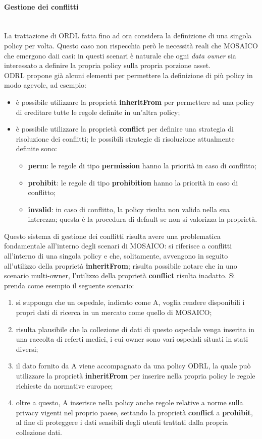 \documentclass[12pt,a4paper,twoside]{book}
\begin{document}
\paragraph{Gestione dei conflitti}\mbox{}\\
La trattazione di ORDL fatta fino ad ora considera la definizione di una singola policy per volta. Questo caso non rispecchia però le necessità reali che MOSAICO che emergono daii casi: in questi scenari è naturale che ogni \textit{data owner} sia interessato a definire la propria policy sulla propria porzione asset.\\
ODRL propone già alcuni elementi per permettere la definizione di più policy in modo agevole, ad esempio: 
\begin{itemize}
	\item è possibile utilizzare la proprietà \textbf{inheritFrom} per permettere ad una policy di ereditare tutte le regole definite in un'altra policy;
	\item è possibile utilizzare la proprietà \textbf{conflict} per definire una strategia di risoluzione dei conflitti; le possibili strategie di risoluzione attualmente definite sono:
	\begin{itemize}
		\item \textbf{perm}: le regole di tipo \textbf{permission} hanno la priorità in caso di conflitto;
		\item \textbf{prohibit}: le regole di tipo \textbf{prohibition} hanno la priorità in caso di conflitto;
		\item \textbf{invalid}: in caso di conflitto, la policy risulta non valida nella sua interezza; questa è la procedura di default se non si valorizza la proprietà.
	\end{itemize}
\end{itemize}
Questo sistema di gestione dei conflitti risulta avere una problematica fondamentale all'interno degli scenari di MOSAICO: si riferisce a conflitti all'interno di una singola policy e che, solitamente, avvengono in seguito all'utilizzo della proprietà \textbf{inheritFrom}; risulta possibile notare che in uno scenario multi-owner, l'utilizzo della proprietà \textbf{conflict} risulta inadatto. Si prenda come esempio il seguente scenario:
\begin{enumerate}
	\item si supponga che un ospedale, indicato come A, voglia rendere disponibili i propri dati di ricerca in un mercato come quello di MOSAICO;
	\item risulta plausibile che la collezione di dati di questo ospedale venga inserita in una raccolta di referti medici, i cui owner sono vari ospedali situati in stati diversi;
	\item il dato fornito da A viene accompagnato da una policy ODRL, la quale può utilizzare la proprietà \textbf{inheritFrom} per inserire nella propria policy le regole richieste da normative europee;
	\item oltre a questo, A inserisce nella policy anche regole relative a norme sulla privacy vigenti nel proprio paese, settando la proprietà \textbf{conflict} a \textbf{prohibit}, al fine di proteggere i dati sensibili degli utenti trattati dalla propria collezione dati.
\end{enumerate}
\end{document}
